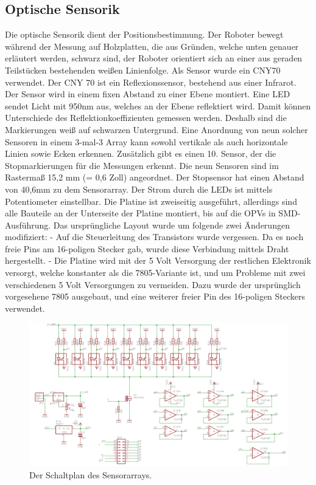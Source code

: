 \documentclass[a4paper,bibtotoc,oneside]{scrbook}
\begin{document}
\subsection{Optische Sensorik}\thispagestyle{empty}
Die optische Sensorik dient der Positionsbestimmung. Der Roboter bewegt während der Messung auf Holzplatten, die aus Gründen, welche unten genauer erläutert werden, schwarz sind, der Roboter orientiert sich an einer aus geraden Teilstücken bestehenden weißen Linienfolge. 
Als Sensor wurde ein CNY70 verwendet. Der CNY 70 ist ein Reflexionssensor, bestehend aus einer Infrarot. Der Sensor wird in einem fixen Abstand zu einer Ebene montiert. Eine LED sendet Licht mit 950nm aus, welches an der Ebene reflektiert wird. Damit können Unterschiede des Reflektionkoeffizienten gemessen werden. Deshalb sind die Markierungen weiß auf schwarzen Untergrund. Eine Anordnung von neun solcher Sensoren in einem 3-mal-3 Array kann sowohl vertikale als auch horizontale Linien sowie Ecken erkennen. Zusätzlich gibt es einen 10. Sensor, der die Stopmarkierungen für die Messungen erkennt.
Die neun Sensoren sind im Rastermaß 15,2 mm (= 0,6 Zoll) angeordnet. Der Stopsensor hat einen Abstand von 40,6mm zu dem Sensorarray. 
Der Strom durch die LEDs ist mittels Potentiometer einstellbar. 
Die Platine ist zweiseitig ausgeführt, allerdings sind alle Bauteile an der Unterseite der Platine montiert, bis auf die OPVs in SMD-Ausführung. Das ursprüngliche Layout wurde um folgende zwei Änderungen modifiziert:
- Auf die Steuerleitung des Transistors wurde vergessen. Da es noch freie Pins am 16-poligen Stecker gab, wurde diese Verbindung mittels Draht hergestellt.
- Die Platine wird mit der 5 Volt Versorgung der restlichen Elektronik versorgt, welche konstanter als die 7805-Variante ist, und um Probleme mit zwei verschiedenen 5 Volt Versorgungen zu vermeiden. Dazu wurde der ursprünglich vorgesehene 7805 ausgebaut, und eine weiterer freier Pin des 16-poligen Steckers verwendet.
\begin{figure}[htbp]
\centering
\includegraphics[width=125mm]{img/array.png}
\caption{Der Schaltplan des Sensorarrays.}\label{array}
\end{figure}
\end{document}
